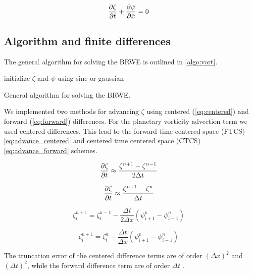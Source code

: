 \begin{equation}\label{eq:scaled_BRWE}
  \pdv{\zeta}{\tilde{t}} + \pdv{\psi}{\tilde{x}} = 0
\end{equation}


\subsection{Algorithm and finite differences}

The general algorithm for solving the BRWE is outlined in
\cref{algo:vort}.

\begin{algorithm}[H]
  \SetAlgoLined
  initialize $\zeta$ and $\psi$ using sine or gaussian\\
  \caption{General algorithm for solving the BRWE.}
  \label{algo:vort}
\end{algorithm}

We implemented two methods for advancing $\zeta$ using centered
(\cref{eq:centered}) and forward (\cref{eq:forward}) differences. For the
planetary vorticity advection term we used centered differences. This lead to
the forward time centered space (FTCS) \cref{eq:advance_centered} and centered
time centered space (CTCS) \cref{eq:advance_forward} schemes.


\begin{equation} \label{eq:centered}
  \pdv{\zeta}{t} \approx \frac{\zeta_{}^{n+1} - \zeta_{}^{n-1}}{2 \Delta t}
\end{equation}

\begin{equation} \label{eq:forward}
  \pdv{\zeta}{t} \approx \frac{\zeta_{}^{n+1} - \zeta_{}^{n}}{\Delta t}
\end{equation}


\begin{equation} \label{eq:advance_centered}
  \zeta_{i}^{n+1} = \zeta_{i}^{n-1} - \frac{\Delta t}{2 \Delta x}
    (\psi_{i+1}^{n} - \psi_{i-1}^{n})
\end{equation}


\begin{equation}   \label{eq:advance_forward}
  \zeta_{i}^{n+1} = \zeta_{i}^{n} - \frac{\Delta t}{\Delta x} (\psi_{i+1}^{n} - \psi_{i-1}^{n})
\end{equation}

The truncation error of the centered difference terms are of order
$(\Delta x)^2$ and
$(\Delta t)^2$, while the forward difference term are of order $\Delta t$
 \parencite{langtangen}.


